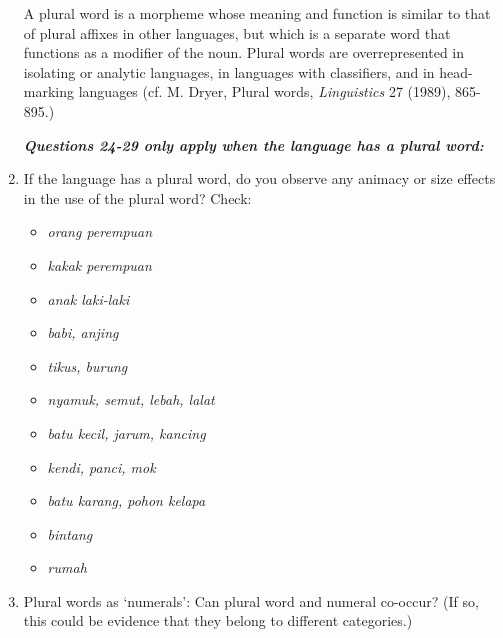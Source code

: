 \begin{enumerate}
A plural word is a morpheme whose meaning and function is similar to that of plural affixes in other languages, but which is a separate word that functions as a modifier of the noun.  Plural words are overrepresented in isolating or analytic languages, in languages with classifiers, and in head-marking languages (cf. M. Dryer, Plural words, \textit{Linguistics} 27 (1989), 865-895.) \nocite{Dryer1989}

\textbf{\textit{Questions 24-29 only apply when the language has a plural word:}}

\item  If the language has a plural word, do you observe any animacy or size effects in the use of the plural word? Check:

\begin{itemize}
\item \textit{orang perempuan}
\item \textit{kakak perempuan}
\item \textit{anak laki-laki}
\item \textit{babi, anjing}
\item \textit{tikus, burung}
\item \textit{nyamuk, semut, lebah, lalat}
\item \textit{batu kecil, jarum, kancing}
\item \textit{kendi, panci, mok}
\item \textit{batu karang, pohon kelapa}
\item \textit{bintang}
\item \textit{rumah}
\end{itemize}
\item  Plural words as `numerals': Can plural word and numeral co-occur? (If so, this could be evidence that they belong to different categories.)


\end{enumerate}
